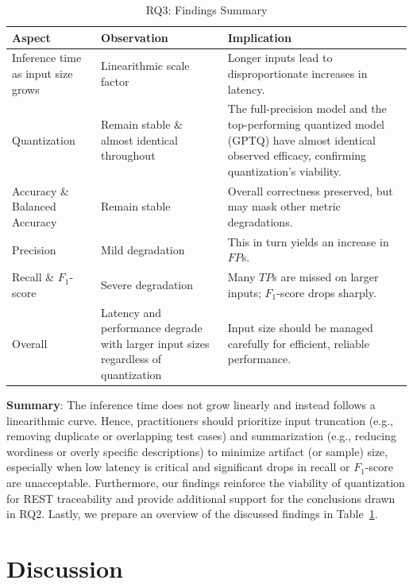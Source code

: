 \documentclass[conference]{IEEEtran}
\begin{document}
\begin{table}[h!]
    \centering
    \begin{tabular}{p{3.5cm}p{4.5cm}p{7cm}}
    \toprule
    \textbf{Aspect} & \textbf{Observation} & \textbf{Implication} \\
    \midrule
    Inference time as input size grows & Linearithmic scale factor & Longer inputs lead to disproportionate increases in latency. \\
    \midrule
    Quantization & Remain stable \& almost identical throughout & The full-precision model and the top-performing quantized model (GPTQ) have almost identical observed efficacy, confirming quantization's viability. \\
    Accuracy \& Balanced Accuracy & Remain stable & Overall correctness preserved, but may mask other metric degradations. \\
    \midrule
    Precision & Mild degradation & This in turn yields an increase in $FP$s. \\
    \midrule
    Recall \& $F_1$-score & Severe degradation & Many $TP$s are missed on larger inputs; $F_1$-score drops sharply. \\
    \midrule
    Overall & Latency and performance degrade with larger input sizes regardless of quantization & Input size should be managed carefully for efficient, reliable performance. \\
    \bottomrule
    \end{tabular}
    \vspace{2mm} %
    \caption{RQ3: Findings Summary}
    \label{tab:summary_findings}
\end{table}

\textbf{Summary}: The inference time does not grow linearly and instead follows a linearithmic curve. Hence, practitioners should prioritize input truncation (e.g., removing duplicate or overlapping test cases) and summarization (e.g., reducing wordiness or overly specific descriptions) to minimize artifact (or sample) size, especially when low latency is critical and significant drops in recall or $F_1$-score are unacceptable. Furthermore, our findings reinforce the viability of quantization for REST traceability and provide additional support for the conclusions drawn in RQ2. Lastly, we prepare an overview of the discussed findings in Table~\ref{tab:summary_findings}.

\section{Discussion}
\end{document}

